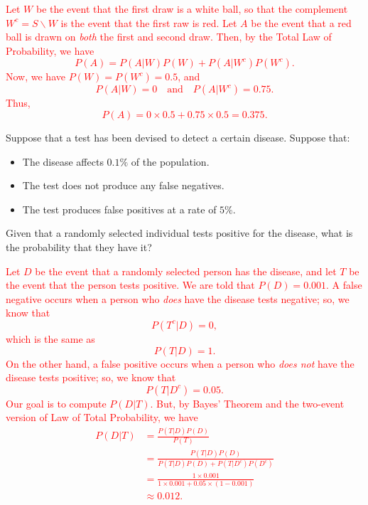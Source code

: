 \documentclass[12pt,reqno]{amsart}
\begin{document}
\bigskip
\textcolor{red}{Let $W$ be the event that the first draw is a white ball, so that the complement $W^c = S\smallsetminus W$ is the event that the first raw is red. Let $A$ be the event that a red ball is drawn on \textit{both} the first and second draw. Then, by the Total Law of Probability, we have
	\[
	P(A) = P(A|W)P(W) + P(A|W^c)P(W^c).
	\]
Now, we have $P(W) = P(W^c) = 0.5$, and
	\[
	P(A|W) = 0 \quad \text{and} \quad P(A|W^c) = 0.75.
	\]
Thus,
	\[
	P(A) = 0 \times 0.5 + 0.75 \times 0.5 = 0.375.
	\]}























\bigskip
\prob Suppose that a test has been devised to detect a certain disease. Suppose that:

\begin{itemize}
\item The disease affects $0.1\%$ of the population.
\item The test does not produce any false negatives.
\item The test produces false positives at a rate of $5\%$.
\end{itemize}

Given that a randomly selected individual tests positive for the disease, what is the probability that they have it?

\bigskip
\textcolor{red}{Let $D$ be the event that a randomly selected person has the disease, and let $T$ be the event that the person tests positive. We are told that $P(D) = 0.001$. A false negative occurs when a person who \textit{does} have the disease tests negative; so, we know that
	\[
	P(T^c|D) =0,
	\]
which is the same as
	\[
	P(T|D) =1.
	\]
On the other hand, a false positive occurs when a person who \textit{does not} have the disease tests positive; so, we know that
	\[
	P(T|D^c) = 0.05.
	\]
Our goal is to compute $P(D|T)$. But, by Bayes' Theorem and the two-event version of Law of Total Probability, we have
	\begin{align*}
	P(D|T) &= \frac{P(T|D)P(D)}{P(T)} \\
	&= \frac{P(T|D)P(D)}{P(T|D)P(D) + P(T|D^c)P(D^c)} \\
	&= \frac{1\times 0.001}{1 \times 0.001 + 0.05 \times (1-0.001)} \\
	&\approx 0.012.
	\end{align*}}
\end{document}
